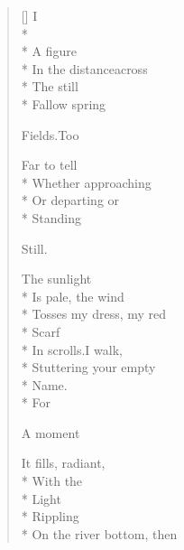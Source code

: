 \label{ch:dogwood_tree}
\settowidth{\versewidth}{Sit down on the river-bank, watching}
\begin{verse}[\versewidth]
\hspace{0.45\versewidth} I\\*
~\\*
A figure\\*
In the distance\qquad across\\*
The still\\*
Fallow spring

Fields.\qquad Too

Far to tell\\*
Whether approaching\\*
Or departing or\\*
Standing

Still.

The sunlight\\*
Is pale, the wind\\*
Tosses my dress, my red\\*
Scarf\\*
In scrolls.\qquad I walk,\\*
Stuttering your empty\\*
Name.\\*
For

A moment

It fills, radiant,\\*
With the\\*
Light\\*
Rippling\\*
On the river bottom, then


\end{verse}
